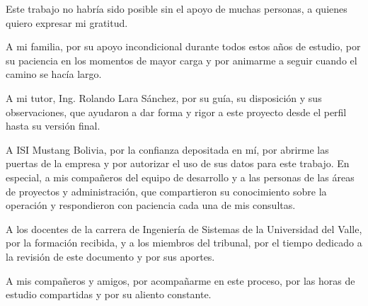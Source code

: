\documentclass{univalle-perfil}
\begin{document}
\makecaratula

\pagestyle{empty}


Este trabajo no habría sido posible sin el apoyo de muchas personas, a quienes quiero expresar mi gratitud.

A mi familia, por su apoyo incondicional durante todos estos años de estudio, por su paciencia en los momentos de mayor carga y por animarme a seguir cuando el camino se hacía largo.

A mi tutor, Ing. Rolando Lara Sánchez, por su guía, su disposición y sus observaciones, que ayudaron a dar forma y rigor a este proyecto desde el perfil hasta su versión final.

A ISI Mustang Bolivia, por la confianza depositada en mí, por abrirme las puertas de la empresa y por autorizar el uso de sus datos para este trabajo. En especial, a mis compañeros del equipo de desarrollo y a las personas de las áreas de proyectos y administración, que compartieron su conocimiento sobre la operación y respondieron con paciencia cada una de mis consultas.

A los docentes de la carrera de Ingeniería de Sistemas de la Universidad del Valle, por la formación recibida, y a los miembros del tribunal, por el tiempo dedicado a la revisión de este documento y por sus aportes.

A mis compañeros y amigos, por acompañarme en este proceso, por las horas de estudio compartidas y por su aliento constante.
\end{document}
